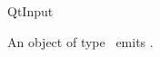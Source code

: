 
\begin{ccRefClass}{QtInput}

\ccDefinition
An object of type \ccRefName\ emits .


\end{ccRefClass}







